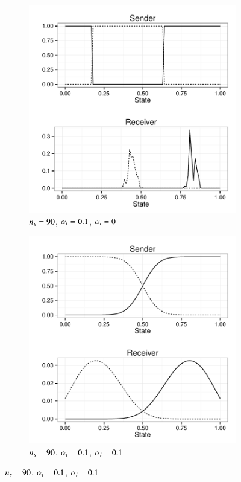 \begin{figure}
  \centering

  \begin{subfigure}[]{0.45\textwidth}
    \includegraphics[width=\textwidth]{plots/strat_example_NS-90_tol-01_imp0_ind3098.pdf}
    \caption{$n_s = 90$, $\alpha_t = 0.1$, $\alpha_i = 0$}
    \label{fig:example_stratsA}
  \end{subfigure}
  \hfill
  \begin{subfigure}[]{0.45\textwidth}
    \includegraphics[width=\textwidth]{plots/strat_example_NS-90_tol-01_imp01_ind3452.pdf}
    \caption{$n_s = 90$, $\alpha_t = 0.1$, $\alpha_i = 0.1$}
    \label{fig:example_stratsB}
  \end{subfigure}


\end{figure}
